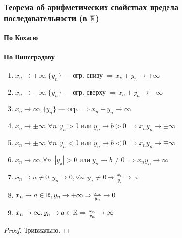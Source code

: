 \subsubsection{Теорема об арифметических свойствах предела последовательности (в $\overline{\mathbb{R}}$)}
\paragraph{По Кохасю}
\paragraph{По Виноградову}
\begin{enumerate}
    \item $x_n\to+\infty, \{y_n\}$ --- огр. снизу $\Rightarrow x_n+y_n\to+\infty$
    \item $x_n\to-\infty, \{y_n\}$ --- огр. сверху $\Rightarrow x_n+y_n\to-\infty$
    \item $x_n\to\infty, \{y_n\}$ --- огр. $\Rightarrow x_n+y_n\to\infty$
    \item $x_n\to\pm\infty, \forall n \ \ y_n>0 $ или $y_n\to b>0$ $\Rightarrow x_ny_n\to\pm\infty$
    \item $x_n\to\pm\infty, \forall n \ \ y_n<0 $ или $y_n\to b<0$ $\Rightarrow x_ny_n\to\mp\infty$
    \item $x_n\to\infty, \forall n \ \ |y_n|>0 $ или $y_n\to b\not=0$ $\Rightarrow x_ny_n\to\infty$
    \item $x_n\to a\not=0, y_n\to0, \forall n \ \ y_n\not=0 \Rightarrow \frac{x_n}{y_n}\to\infty$
    \item $x_n\to a\in\mathbb{R}, y_n\to+\infty \Rightarrow \frac{x_n}{y_n}\to0$
    \item $x_n\to\infty, y_n\to a\in\mathbb{R} \Rightarrow \frac{x_n}{y_n}\to\infty$
\end{enumerate}

\begin{proof}
    Тривиально.
\end{proof}
